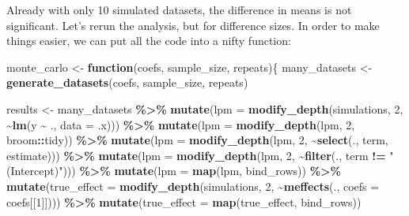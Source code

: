 \documentclass[
]{article}
\newenvironment{Shaded}{\begin{snugshade}}{\end{snugshade}}
\newcommand{\ControlFlowTok}[1]{\textcolor[rgb]{0.13,0.29,0.53}{\textbf{#1}}}
\newcommand{\DataTypeTok}[1]{\textcolor[rgb]{0.13,0.29,0.53}{#1}}
\newcommand{\DecValTok}[1]{\textcolor[rgb]{0.00,0.00,0.81}{#1}}
\newcommand{\KeywordTok}[1]{\textcolor[rgb]{0.13,0.29,0.53}{\textbf{#1}}}
\newcommand{\NormalTok}[1]{#1}
\newcommand{\OperatorTok}[1]{\textcolor[rgb]{0.81,0.36,0.00}{\textbf{#1}}}
\newcommand{\StringTok}[1]{\textcolor[rgb]{0.31,0.60,0.02}{#1}}
\begin{document}
Already with only 10 simulated datasets, the difference in means is not significant. Let's rerun
the analysis, but for difference sizes. In order to make things easier, we can put all the code
into a nifty function:

\begin{Shaded}
\begin{Highlighting}[]
\NormalTok{monte\_carlo \textless{}{-}}\StringTok{ }\ControlFlowTok{function}\NormalTok{(coefs, sample\_size, repeats)\{}
\NormalTok{  many\_datasets \textless{}{-}}\StringTok{ }\KeywordTok{generate\_datasets}\NormalTok{(coefs, sample\_size, repeats)}
  
\NormalTok{  results \textless{}{-}}\StringTok{ }\NormalTok{many\_datasets }\OperatorTok{\%\textgreater{}\%}\StringTok{ }
\StringTok{    }\KeywordTok{mutate}\NormalTok{(}\DataTypeTok{lpm =} \KeywordTok{modify\_depth}\NormalTok{(simulations, }\DecValTok{2}\NormalTok{, }\OperatorTok{\textasciitilde{}}\KeywordTok{lm}\NormalTok{(y }\OperatorTok{\textasciitilde{}}\StringTok{ }\NormalTok{., }\DataTypeTok{data =}\NormalTok{ .x))) }\OperatorTok{\%\textgreater{}\%}\StringTok{ }
\StringTok{    }\KeywordTok{mutate}\NormalTok{(}\DataTypeTok{lpm =} \KeywordTok{modify\_depth}\NormalTok{(lpm, }\DecValTok{2}\NormalTok{, broom}\OperatorTok{::}\NormalTok{tidy)) }\OperatorTok{\%\textgreater{}\%}\StringTok{ }
\StringTok{    }\KeywordTok{mutate}\NormalTok{(}\DataTypeTok{lpm =} \KeywordTok{modify\_depth}\NormalTok{(lpm, }\DecValTok{2}\NormalTok{, }\OperatorTok{\textasciitilde{}}\KeywordTok{select}\NormalTok{(., term, estimate))) }\OperatorTok{\%\textgreater{}\%}\StringTok{ }
\StringTok{    }\KeywordTok{mutate}\NormalTok{(}\DataTypeTok{lpm =} \KeywordTok{modify\_depth}\NormalTok{(lpm, }\DecValTok{2}\NormalTok{, }\OperatorTok{\textasciitilde{}}\KeywordTok{filter}\NormalTok{(., term }\OperatorTok{!=}\StringTok{ "(Intercept)"}\NormalTok{))) }\OperatorTok{\%\textgreater{}\%}\StringTok{ }
\StringTok{    }\KeywordTok{mutate}\NormalTok{(}\DataTypeTok{lpm =} \KeywordTok{map}\NormalTok{(lpm, bind\_rows)) }\OperatorTok{\%\textgreater{}\%}\StringTok{ }
\StringTok{    }\KeywordTok{mutate}\NormalTok{(}\DataTypeTok{true\_effect =} \KeywordTok{modify\_depth}\NormalTok{(simulations, }\DecValTok{2}\NormalTok{, }\OperatorTok{\textasciitilde{}}\KeywordTok{meffects}\NormalTok{(., }\DataTypeTok{coefs =}\NormalTok{ coefs[[}\DecValTok{1}\NormalTok{]]))) }\OperatorTok{\%\textgreater{}\%}\StringTok{ }
\StringTok{    }\KeywordTok{mutate}\NormalTok{(}\DataTypeTok{true\_effect =} \KeywordTok{map}\NormalTok{(true\_effect, bind\_rows))}


\end{Highlighting}
\end{Shaded}
\end{document}
